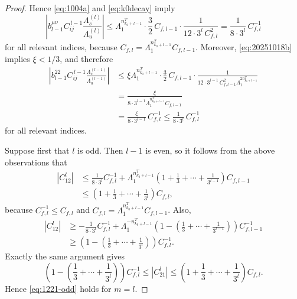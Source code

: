 \documentclass{amsart}
\theoremstyle{plain}
\theoremstyle{definition}
\theoremstyle{remark}
\numberwithin{equation}{section}
\begin{document}
\begin{proof}
Hence \eqref{eq:1004a} and \eqref{eq:k0decay} imply
\[
\left|b_{l-1}^{\mu\nu}C_{ij}^{\,l-1}\frac{\Lambda_s^{(l)}}{\Lambda_u^{(l)}}\right|
\le
\Lambda_1^{n_{k_0+l-1}^T}\cdot \frac32\,C_{f,l-1}\cdot
\frac{1}{12\cdot 3^l\,C_{f,l}^2}
=
\frac{1}{8\cdot 3^l}\,C_{f,l}^{-1}
\]
for all relevant indices, because
$
C_{f,l}=\Lambda_1^{n_{k_0+l-1}^T}C_{f,l-1}.
$
Moreover, \eqref{eq:20251018b} implies $\xi<1/3$, and therefore
\begin{align*}
\left|b_{l-1}^{22}C_{ij}^{\,l-1}\frac{\Lambda_s^{(l-1)}}{\Lambda_u^{(l-1)}}\right|
&\le
\xi\Lambda_1^{n_{k_0+l-1}^T}\cdot \frac32\,C_{f,l-1}\cdot
\frac{1}{12\cdot 3^{l-1}\,C_{f,l-1}^2\Lambda_1^{2n_{k_0+l-1}^T}}\\
&=
\frac{\xi}{8\cdot 3^{l-1}\Lambda_1^{n_{k_0+l-1}^T}C_{f,l-1}}\\
&=
\frac{\xi}{8\cdot 3^{l-1}}\,C_{f,l}^{-1}
\le
\frac{1}{8\cdot 3^l}\,C_{f,l}^{-1}
\end{align*}
for all relevant indices.

Suppose first that $l$ is odd. Then $l-1$ is even, so it follows from the above observations that
\begin{align*}
|C_{12}^{l}|
&\le
\frac{1}{8\cdot 3^l}C_{f,l}^{-1}
+\Lambda_1^{n_{k_0+l-1}^T}
\left(1+\frac{1}{3}+\cdots +\frac{1}{3^{l-1}}\right)C_{f,l-1}\\
&\le
\left(1+\frac{1}{3}+\cdots +\frac{1}{3^{l}}\right)C_{f,l},
\end{align*}
because $C_{f,l}^{-1}\le C_{f,l}$ and $C_{f,l}=\Lambda_1^{n_{k_0+l-1}^T}C_{f,l-1}$. Also,
\begin{align*}
|C_{12}^{l}|
&\ge
-\frac{1}{8\cdot 3^l}C_{f,l}^{-1}
+\Lambda_1^{-n_{k_0+l-1}^T}
\left(1-\left(\frac{1}{3}+\cdots +\frac{1}{3^{l-1}}\right)\right)C_{f,l-1}^{-1}\\
&\ge
\left(1-\left(\frac{1}{3}+\cdots +\frac{1}{3^{l}}\right)\right)C_{f,l}^{-1}.
\end{align*}
Exactly the same argument gives
\[
\left(1-\left(\frac{1}{3}+\cdots +\frac{1}{3^{l}}\right)\right)C_{f,l}^{-1}
\le |C_{21}^{l}|
\le
\left(1+\frac{1}{3}+\cdots +\frac{1}{3^{l}}\right)C_{f,l}.
\]
Hence \eqref{eq:1221-odd} holds for $m=l$.


\end{proof}
\end{document}
